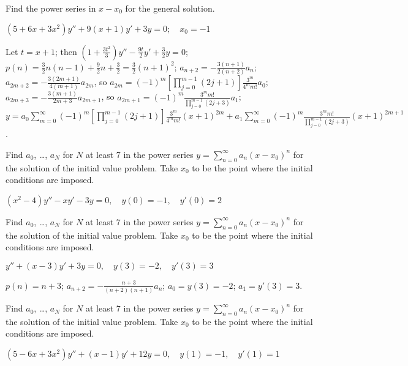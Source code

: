 \documentclass{ximera}
\begin{document}
\begin{problem}\label{exer:7.2.20} 
Find the power series in $x-x_0$
for the general solution.

$(5+6x+3x^2)y''+9(x+1)y'+3y=0;\quad  x_0=-1$

\begin{solution}
    Let $t=x+1$;  then
$\left(1+\frac{3t^2}{3}\right)y''-\frac{9t}{2}y'+\frac{3}{2}y=0$;
$p(n)=\frac{3}{2}n(n-1)+\frac{9}{2}n+\frac{3}{2}=\frac{3}{2}(n+1)^2$;
$a_{n+2}=-\frac{3(n+1)}{2(n+2)}a_n$;
$a_{2m+2}=-\frac{3(2m+1)}{4(m+1)}a_{2m}$, so
$a_{2m}=(-1)^m\left[\prod_{j=0}^{m-1}(2j+1)\right]\frac{3^m}{4^mm!}a_0$;
$a_{2m+3}=-\frac{3(m+1)}{2m+3}a_{2m+1}$,
so $a_{2m+1}=(-1)^m\frac{3^mm!}{\prod_{j=0}^{m-1}(2j+3)}a_1$;\\
$y=a_0\sum_{m=0}^\infty(-1)^m\left[\prod_{j=0}^{m-1}(2j+1)\right]
\frac{3^m}{4^mm!}(x+1)^{2m}+a_1\sum_{m=0}^\infty(-1)^m\frac{3^mm!}{
\prod_{j=0}^{m-1}(2j+3)}(x+1)^{2m+1}$.
\end{solution}
\end{problem}

\begin{problem}\label{exer:7.2.21}  Find $a_0$, \dots, $a_N$ for $N$ at least $7$ in the power series
$y=\sum_{n=0}^\infty a_n(x-x_0)^n$
 for the  solution of the initial value problem.  Take $x_0$ to be the
point where the initial conditions are imposed.

$(x^2-4)y''-xy'-3y=0,\quad y(0)=-1,\quad
y'(0)=2$
\end{problem}

\begin{problem}\label{exer:7.2.22}  Find $a_0$, \dots, $a_N$ for $N$ at least $7$ in the power series
$y=\sum_{n=0}^\infty a_n(x-x_0)^n$
 for the  solution of the initial value problem.  Take $x_0$ to be the
point where the initial conditions are imposed.

$y''+(x-3)y'+3y=0,\quad y(3)=-2,\quad
y'(3)=3$

\begin{solution}
    $p(n)=n+3$;
$a_{n+2}=-\frac{n+3}{(n+2)(n+1)}a_n$;
$a_0=y(3)=-2$; $a_1=y'(3)=3$.
\end{solution}
\end{problem}

\begin{problem}\label{exer:7.2.23}  Find $a_0$, \dots, $a_N$ for $N$ at least $7$ in the power series
$y=\sum_{n=0}^\infty a_n(x-x_0)^n$
 for the  solution of the initial value problem.  Take $x_0$ to be the
point where the initial conditions are imposed.

$(5-6x+3x^2)y''+(x-1)y'+12y=0,\quad
y(1)=-1,\quad y'(1)=1$
\end{problem}
\end{document}
